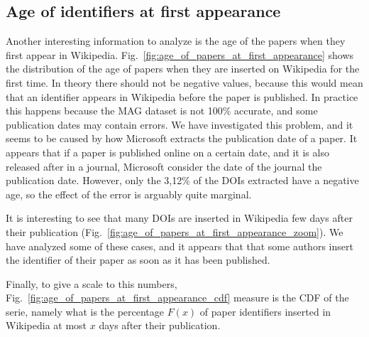 \subsection{Age of identifiers at first appearance}
Another interesting information to analyze is the age of the papers when they first appear in Wikipedia.
Fig.~\ref{fig:age_of_papers_at_first_appearance} shows the distribution of the age of papers when they are inserted on Wikipedia for the first time.
In theory there should not be negative values, because this would mean that an identifier appears in Wikipedia before the paper is published.
In practice this happens because the \ac{MAG} dataset is not 100\% accurate, and some publication dates may contain errors.
We have investigated this problem, and it seems to be caused by how Microsoft extracts the publication date of a paper.
It appears that if a paper is published online on a certain date, and it is also released after in a journal, Microsoft consider the date of the journal the publication date.
However, only the 3,12\% of the \acp{DOI} extracted have a negative age, so the effect of the error is arguably quite marginal.

It is interesting to see that many \acp{DOI} are inserted in Wikipedia few days after their publication (Fig.~\ref{fig:age_of_papers_at_first_appearance_zoom}).
We have analyzed some of these cases, and it appears that that some authors insert the identifier of their paper as soon as it has been published.

Finally, to give a scale to this numbers, Fig.~\ref{fig:age_of_papers_at_first_appearance_cdf} measure is the \ac{CDF} of the serie, namely what is the percentage $F(x)$ of paper identifiers inserted in Wikipedia at most $x$ days after their publication.


